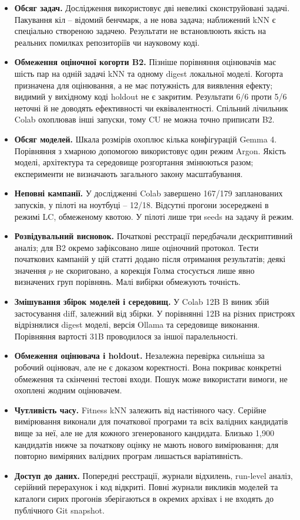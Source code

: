 \documentclass[11pt]{article}
\begin{document}
\begin{itemize}
\item \textbf{Обсяг задач.} Дослідження використовує дві невеликі сконструйовані задачі. Пакування кіл -- відомий бенчмарк, а не нова задача; наближений kNN є спеціально створеною задачею. Результати не встановлюють якість на реальних помилках репозиторіїв чи науковому коді.
\item \textbf{Обмеження оціночної когорти B2.} Пізніше порівняння оцінювачів має шість пар на одній задачі kNN та одному digest локальної моделі. Когорта призначена для оцінювання, а не має потужність для виявлення ефекту; видимий у вихідному коді holdout не є закритим. Результати 6/6 проти 5/6 неточні й не доводять ефективності чи еквівалентності. Спільний лічильник Colab охоплював інші запуски, тому CU не можна точно приписати B2.
\item \textbf{Обсяг моделей.} Шкала розмірів охоплює кілька конфігурацій Gemma 4. Порівняння з хмарною допомогою використовує один режим Argon. Якість моделі, архітектура та середовище розгортання змінюються разом; експерименти не визначають загального закону масштабування.
\item \textbf{Неповні кампанії.} У дослідженні Colab завершено 167/179 запланованих запусків, у пілоті на ноутбуці -- 12/18. Відсутні прогони зосереджені в режимі LC, обмеженому квотою. У пілоті лише три seeds на задачу й режим.
\item \textbf{Розвідувальний висновок.} Початкові реєстрації передбачали дескриптивний аналіз; для B2 окремо зафіксовано лише оціночний протокол. Тести початкових кампаній у цій статті додано після отримання результатів; деякі значення $p$ не скориговано, а корекція Голма стосується лише явно визначених груп порівнянь. Малі вибірки обмежують точність.
\item \textbf{Змішування збірок моделей і середовищ.} У Colab 12B B виник збій застосування diff, залежний від збірки. У порівнянні 12B на різних пристроях відрізнялися digest моделі, версія Ollama та середовище виконання. Порівняння вартості 31B проводилося за іншої паралельності.
\item \textbf{Обмеження оцінювача і holdout.} Незалежна перевірка сильніша за робочий оцінювач, але не є доказом коректності. Вона покриває конкретні обмеження та скінченні тестові входи. Пошук може використати вимоги, не охоплені жодним оцінювачем.
\item \textbf{Чутливість часу.} Fitness kNN залежить від настінного часу. Серійне вимірювання виконали для початкової програми та всіх валідних кандидатів вище за неї, але не для кожного згенерованого кандидата. Близько 1{,}900 кандидатів нижче за початкову оцінку не мають нового вимірювання; для повторно виміряних валідних програм лишається варіативність.
\item \textbf{Доступ до даних.} Попередні реєстрації, журнали відхилень, run-level аналіз, серійний перерахунок і код відкриті. Повні журнали викликів моделей та каталоги сирих прогонів зберігаються в окремих архівах і не входять до публічного Git snapshot.
\end{itemize}
\end{document}
